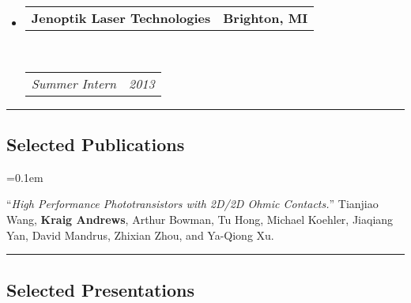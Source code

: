 \documentclass[10pt,letterpaper]{article}
\makeatletter
\newcommand{\headerrow}[2]
{\begin{tabular*}{\linewidth}{l@{\extracolsep{\fill}}r}
	#1 &
	#2 \\
\end{tabular*}}
\makeatother
\begin{document}
\begin{itemize}
	\item 
	\headerrow
		{\textbf{Jenoptik Laser Technologies}}
		{\textbf{Brighton, MI}}
	\\
	\headerrow
		{\emph{Summer Intern}}
		{\emph{2013}}
\end{itemize}

\hrule
\vspace{-0.4em}
\subsection*{Selected Publications}

\begin{enumerate*}
	\parskip=0.1em
	\item ``\emph{High Performance  Phototransistors with 2D/2D Ohmic Contacts.}''
	Tianjiao Wang, \textbf{Kraig Andrews}, Arthur Bowman, Tu Hong, Michael Koehler, Jiaqiang Yan, David Mandrus, Zhixian Zhou, and Ya-Qiong Xu.
\end{enumerate*}

\hrule
\vspace{-0.4em}
\subsection*{Selected Presentations}
\end{document}
